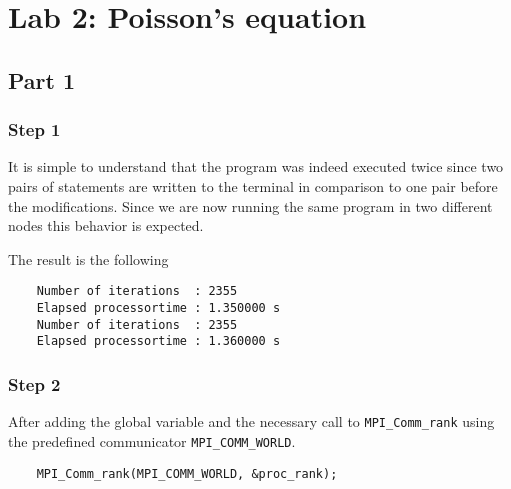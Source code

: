 \section{Lab 2: Poisson's equation}


\subsection{Part 1}
\subsubsection{Step 1}

It is simple to understand that the program was indeed executed twice since two pairs of statements are written to the terminal in comparison to one pair before the modifications. Since we are now running the same program in two different nodes this behavior is expected.  

The result is the following
\begin{lstlisting}
    Number of iterations  : 2355
    Elapsed processortime : 1.350000 s
    Number of iterations  : 2355
    Elapsed processortime : 1.360000 s
\end{lstlisting}

\subsubsection{Step 2}

After adding the global variable and the necessary call to \texttt{MPI\_Comm\_rank} using the predefined communicator \texttt{MPI\_COMM\_WORLD}.
\begin{lstlisting}
    MPI_Comm_rank(MPI_COMM_WORLD, &proc_rank);
\end{lstlisting}

